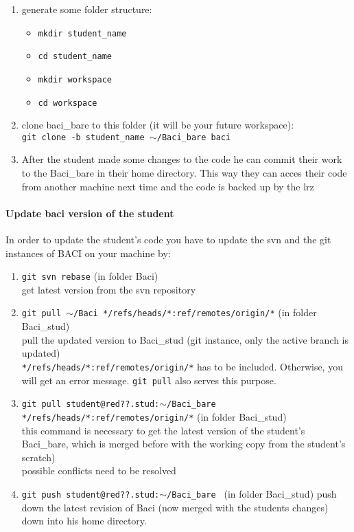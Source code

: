 \begin{enumerate}
  \item generate some folder structure:
\begin{itemize}
  \item \texttt{mkdir student\_name}
  \item \texttt{cd student\_name}
  \item \texttt{mkdir workspace}
  \item \texttt{cd workspace}
\end{itemize}
  \item clone baci\_bare to this folder (it will be your future workspace): \\
  \texttt{git clone -b student\_name $\sim$/Baci\_bare baci}
  \item {After the student made some changes to the code he can commit their work to the \/Baci\_bare in their
home directory. This way they can acces their code from another machine next time and the code is backed up by the lrz }	
\end{enumerate}



\paragraph{Update baci version of the student}
In order to update the student's code you have to update the svn and the git instances of BACI on your machine by:
  \begin{enumerate}
    \item \texttt{git svn rebase} (in folder Baci)\\
    get latest version from the svn repository
    \item \texttt{git pull $\sim$/Baci */refs/heads/*:ref/remotes/origin/*} (in folder Baci\_stud) \\
    pull the updated version to Baci\_stud (git instance, only the active branch is updated)\\
    \texttt{*/refs/heads/*:ref/remotes/origin/*} has to be included. Otherwise, you will get an error message. 
    \texttt{git pull} also serves this purpose.
    \item \texttt{git pull student@red??.stud:$\sim$/Baci\_bare */refs/heads/*:ref/remotes/origin/*} (in folder Baci\_stud)\\
    this command is necessary to get the latest version of the student's Baci\_bare, which is merged before with the working copy from the student's scratch) \\
    possible conflicts need to be resolved
    \item \texttt{git push student@red??.stud:$\sim$/Baci\_bare } (in folder Baci\_stud)
    push down the latest revision of Baci (now merged with the students changes) down into his home directory.	
  \end{enumerate}

